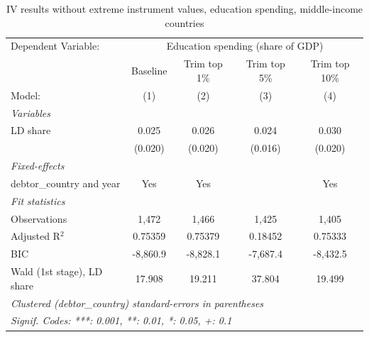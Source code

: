 
\begin{table}[htbp]
   \caption{\label{tab:results_iv_trim_top_educ_other} IV results without extreme instrument values, education spending, middle-income countries}
   \centering
   \begin{tabular}{lcccc}
      \tabularnewline \midrule \midrule
      Dependent Variable: & \multicolumn{4}{c}{Education spending (share of GDP)}\\
                                 & Baseline & Trim top 1\%  & Trim top 5\%  & Trim top 10\% \\    
      Model:                     & (1)      & (2)           & (3)           & (4)\\  
      \midrule
      \emph{Variables}\\
      LD share                   & 0.025    & 0.026         & 0.024         & 0.030\\   
                                 & (0.020)  & (0.020)       & (0.016)       & (0.020)\\   
      \midrule
      \emph{Fixed-effects}\\
      debtor\_country and year   & Yes      & Yes           &               & Yes\\  
      \midrule
      \emph{Fit statistics}\\
      Observations               & 1,472    & 1,466         & 1,425         & 1,405\\  
      Adjusted R$^2$             & 0.75359  & 0.75379       & 0.18452       & 0.75333\\  
      BIC                        & -8,860.9 & -8,828.1      & -7,687.4      & -8,432.5\\  
      Wald (1st stage), LD share & 17.908   & 19.211        & 37.804        & 19.499\\  
      \midrule \midrule
      \multicolumn{5}{l}{\emph{Clustered (debtor\_country) standard-errors in parentheses}}\\
      \multicolumn{5}{l}{\emph{Signif. Codes: ***: 0.001, **: 0.01, *: 0.05, +: 0.1}}\\
   \end{tabular}
\end{table}


